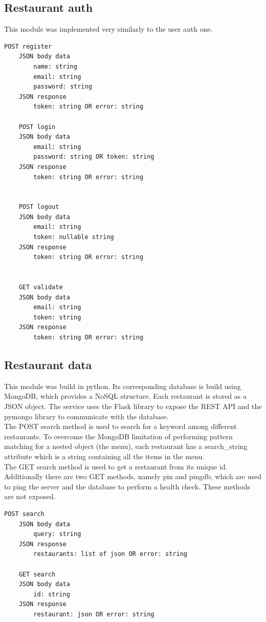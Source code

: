 \subsection{Restaurant auth}

This module was implemented very similarly to the user auth one.


\begin{lstlisting}[language=bash,caption={Restaurant auth exposed API}]
    POST register
    JSON body data
        name: string
        email: string
        password: string
    JSON response
        token: string OR error: string
        
    POST login
    JSON body data
        email: string
        password: string OR token: string
    JSON response
        token: string OR error: string


    POST logout
    JSON body data
        email: string
        token: nullable string
    JSON response
        token: string OR error: string


    GET validate
    JSON body data
        email: string
        token: string
    JSON response
        token: string OR error: string
\end{lstlisting}

\subsection{Restaurant data}
This module was build in python. Its corresponding database is build using MongoDB, which provides a NoSQL structure. Each restaurant is stored as a JSON object. The service uses the Flask library to expose the REST API and the pymongo library to communicate with the database. \\
The POST search method is used to search for a keyword among different restaurants. To overcome the MongoDB limitation of performing pattern matching for a nested object (the menu), each restaurant has a search\_string attribute which is a string containing all the items in the menu. \\
The GET search method is used to get a restaurant from its unique id. \\
Additionally there are two GET methods, namely pin and pingdb, which are used to ping the server and the database to perform a health check. These methods are not exposed. 


\begin{lstlisting}[language=bash,caption={Restaurant data exposed API}]
    POST search
    JSON body data
        query: string
    JSON response
        restaurants: list of json OR error: string
        
    GET search
    JSON body data
        id: string
    JSON response
        restaurant: json OR error: string
\end{lstlisting}


